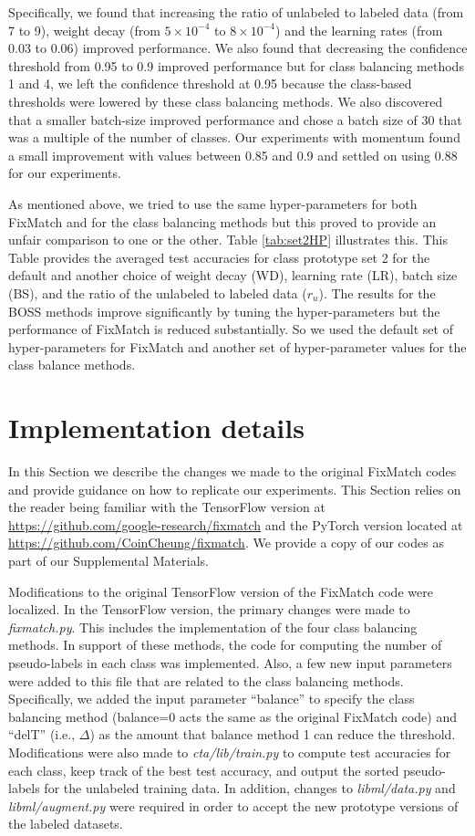 \documentclass[final]{cvpr}
\newcommand{\HP}{hyper-parameter }
\newcommand{\HPs}{hyper-parameters }
\begin{document}
Specifically, we found that increasing the ratio of unlabeled to labeled data (from 7 to 9), weight decay (from $ 5 \times 10^{-4}$ to $8 \times 10^{-4}$)  and the learning rates (from 0.03 to 0.06) improved performance.
We also found that decreasing the confidence threshold from 0.95 to 0.9 improved performance but for class balancing methods 1 and 4, we left the confidence threshold at 0.95 because the class-based thresholds were lowered by these class balancing methods.
We also discovered that a smaller batch-size improved performance and chose a batch size of 30 that was a multiple of the number of classes. 
Our experiments with momentum found a small improvement with values between 0.85 and 0.9 and settled on using 0.88 for our experiments.

As mentioned above, we tried to use the same \HPs for both FixMatch and for the class balancing methods but this proved to provide an unfair comparison to one or the other.
Table \ref{tab:set2HP} illustrates this.
This Table provides the averaged test accuracies for class prototype set 2 for the default and another choice of weight decay (WD), learning rate (LR), batch size (BS), and the ratio of the unlabeled to labeled data ($r_u$).
The results for the BOSS methods improve significantly by tuning the \HPs but the performance of FixMatch is reduced substantially.
So we used the default set of \HPs for FixMatch and another set of \HP values for the class balance methods.

\section{Implementation details}
\label{sec:Implementation}

In this Section we describe the changes we made to the original FixMatch codes and provide guidance on how to replicate our experiments.  This Section relies on the reader being familiar with the TensorFlow version at \url{https://github.com/google-research/fixmatch} and the PyTorch version located at \url{https://github.com/CoinCheung/fixmatch}.  We provide a copy of our codes as part of our Supplemental Materials.

Modifications to the original TensorFlow version of the FixMatch code were localized.
In the TensorFlow version, the primary changes were made to \emph{fixmatch.py}.
This includes the implementation of the four class balancing methods.
In support of these methods, the code for computing the number of pseudo-labels in each class was implemented.
Also, a few new input parameters were added to this file that are related to the class balancing methods.
Specifically, we added the input parameter ``balance'' to specify the class balancing method (balance=0 acts the same as the original FixMatch code) and ``delT'' (i.e., $ \Delta $) as the amount that balance method 1 can reduce the threshold.
Modifications were also made to \emph{cta/lib/train.py} to compute test accuracies for each class, keep track of the best test accuracy, and output the sorted pseudo-labels for the unlabeled training data.
In addition, changes to \emph{libml/data.py} and \emph{libml/augment.py} were required in order to accept the new prototype versions of the labeled datasets.
\end{document}
